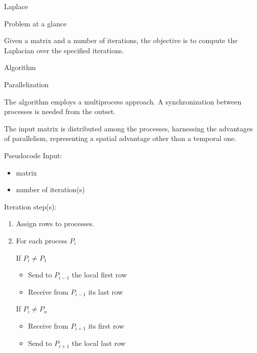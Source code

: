 \begin{chapter}{Laplace}
    \begin{section}{Problem at a glance}
        \par Given a matrix and a number of iterations, the objective is to compute the Laplacian over the specified iterations.
    \end{section}
    \begin{section}{Algorithm}
        \begin{subsection}{Parallelization}
            \par The algorithm employs a multiprocess approach. A synchronization between processes is needed from the outset.
            \par The input matrix is distributed among the processes, harnessing the advantages of parallelism, representing a spatial advantage other than a temporal one.
        \end{subsection}
        \begin{subsection}{Pseudocode}
            Input:
            \begin{itemize}
                \item matrix
                \item number of iteration(s)
            \end{itemize}
            Iteration step(s):
            \begin{enumerate}
                \item Assign rows to processes.
                \item For each process $P_i$
                \begin{enumerate}
                    \begin{item}
                        If $P_i \neq P_1$
                        \begin{itemize}
                            \item Send to $P_{i-1}$ the local first row
                            \item Receive from $P_{i-1}$ its last row
                        \end{itemize}
                    \end{item}
                    \begin{item}
                        If $P_i \neq P_n$
                        \begin{itemize}
                            \item Receive from $P_{i+1}$ its first row
                            \item Send to $P_{i+1}$ the local last row

\end{itemize}
\end{item}
\end{enumerate}
\end{enumerate}
\end{subsection}
\end{section}
\end{chapter}
